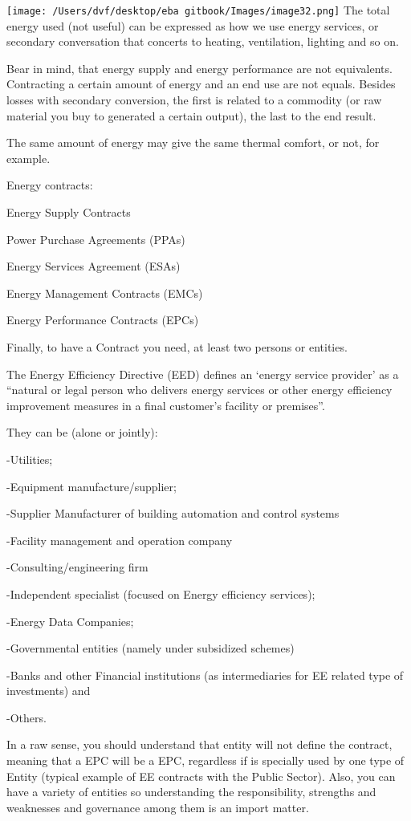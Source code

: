 \documentclass[]{book}
\theoremstyle{definition}
\theoremstyle{definition}
\theoremstyle{definition}
\theoremstyle{remark}
\begin{document}
\texttt{[image: /Users/dvf/desktop/eba gitbook/Images/image32.png]}
The total energy used (not useful) can be expressed as how we use energy
services, or secondary conversation that concerts to heating,
ventilation, lighting and so on.

Bear in mind, that energy supply and energy performance are not
equivalents. Contracting a certain amount of energy and an end use are
not equals. Besides losses with secondary conversion, the first is
related to a commodity (or raw material you buy to generated a certain
output), the last to the end result.

The same amount of energy may give the same thermal comfort, or not, for
example.

Energy contracts:

Energy Supply Contracts

Power Purchase Agreements (PPAs)

Energy Services Agreement (ESAs)

Energy Management Contracts (EMCs)

Energy Performance Contracts (EPCs)

Finally, to have a Contract you need, at least two persons or entities.

The Energy Efficiency Directive (EED) defines an `energy service
provider' as a ``natural or legal person who delivers energy services or
other energy efficiency improvement measures in a final customer's
facility or premises''.

They can be (alone or jointly):

-Utilities;

-Equipment manufacture/supplier;

-Supplier Manufacturer of building automation and control systems

-Facility management and operation company

-Consulting/engineering firm

-Independent specialist (focused on Energy efficiency services);

-Energy Data Companies;

-Governmental entities (namely under subsidized schemes)

-Banks and other Financial institutions (as intermediaries for EE
related type of investments) and

-Others.

In a raw sense, you should understand that entity will not define the
contract, meaning that a EPC will be a EPC, regardless if is specially
used by one type of Entity (typical example of EE contracts with the
Public Sector). Also, you can have a variety of entities so
understanding the responsibility, strengths and weaknesses and
governance among them is an import matter.
\end{document}
